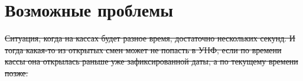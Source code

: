 \section{Возможные проблемы}


  \sout {Ситуация, когда на кассах будет разное время, достаточно нескольких секунд. И тогда какая-то из открытых смен может не попасть в УНФ, если по времени кассы она открылась раньше уже зафиксированной даты, а по текущему времени позже.}


